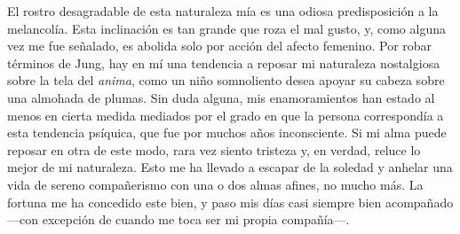 \documentclass[a4paper, 12pt]{article}
\begin{document}
El rostro desagradable de esta naturaleza mía es una odiosa predisposición a la
melancolía. Esta inclinación es tan grande que roza el mal gusto, y, como alguna
vez me fue señalado, es abolida solo por acción del afecto femenino. Por robar
términos de Jung, hay en mí una tendencia a reposar mi naturaleza nostalgiosa
sobre la tela del \textit{anima}, como un niño somnoliento desea apoyar su
cabeza sobre una almohada de plumas. Sin duda alguna, mis enamoramientos han
estado al menos en cierta medida mediados por el grado en que la persona
correspondía a esta tendencia psíquica, que fue por muchos años inconsciente. Si
mi alma puede reposar en otra de este modo, rara vez siento tristeza y, en
verdad, reluce lo mejor de mi naturaleza. Esto me ha llevado a escapar de la
soledad y anhelar una vida de sereno compañerismo con una o dos almas afines, no
mucho más. La fortuna me ha concedido este bien, y paso mis días casi siempre
bien acompañado ---con excepción de cuando me toca ser mi propia compañía---.
\end{document}
